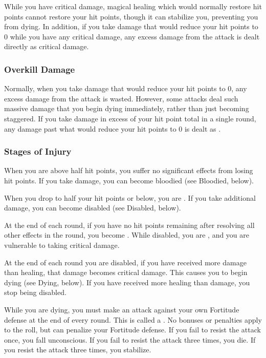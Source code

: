             While you have critical damage, magical healing which would normally restore hit points cannot restore your hit points, though it can stabilize you, preventing you from dying.
            In addition, if you take damage that would reduce your hit points to 0 while you have any critical damage, any excess damage from the attack is dealt directly as critical damage.

        \subsubsection{Overkill Damage}\label{Overkill Damage}
            Normally, when you take damage that would reduce your hit points to 0, any excess damage from the attack is wasted.
            However, some attacks deal such massive damage that you begin dying immediately, rather than just becoming staggered.
            If you take damage in excess of your  hit point total in a single round, any damage past what would reduce your hit points to 0 is dealt as .

        \subsubsection{Stages of Injury}

             When you are above half hit points, you suffer no significant effects from losing hit points.
            If you take damage, you can become bloodied (see Bloodied, below).

             When you drop to half your hit points or below, you are \bloodied.
            If you take additional damage, you can become disabled (see Disabled, below).

            \label{Disabled} At the end of each round, if you have no hit points remaining after resolving all other effects in the round, you become \disabled.
            While disabled, you are \staggered, and you are vulnerable to taking critical damage.

            At the end of each round you are disabled, if you have received more damage than healing, that damage becomes critical damage.
            This causes you to begin dying (see Dying, below).
            If you have received more healing than damage, you stop being disabled.

            \label{Dying} While you are dying, you must make an attack against your own Fortitude defense at the end of every round.
            This is called a .
            No bonuses or penalties apply to the roll, but  can penalize your Fortitude defense.
            If you fail to resist the attack once, you fall unconscious.
            If you fail to resist the attack three times, you die.
            If you resist the attack three times, you stabilize.

